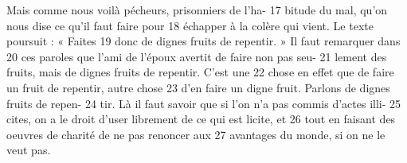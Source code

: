Mais comme nous voilà pécheurs, prisonniers de l'ha-	 
17	 	bitude du mal, qu'on nous dise ce qu'il faut faire pour	 
18	 	échapper à la colère qui vient. Le texte poursuit : « Faites	 
19	 	donc de dignes fruits de repentir. » Il faut remarquer dans	 
20	 	ces paroles que l'ami de l'époux avertit de faire non pas seu-	 
21	 	lement des fruits, mais de dignes fruits de repentir. C'est une	 
22	 	chose en effet que de faire un fruit de repentir, autre chose	 
23	 	d'en faire un digne fruit. Parlons de dignes fruits de repen-	 
24	 	tir. Là il faut savoir que si l'on n'a pas commis d'actes illi-	 
25	 	cites, on a le droit d'user librement de ce qui est licite, et	 
26	 	tout en faisant des oeuvres de charité de ne pas renoncer aux	 
27	 	avantages du monde, si on ne le veut pas.